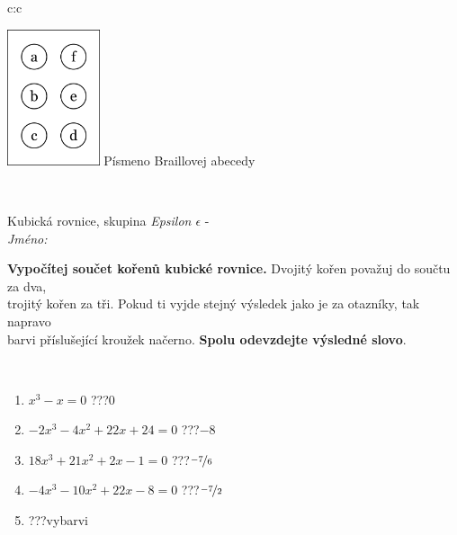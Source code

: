 \documentclass[10pt]{report}
\begin{document}
\begin{tabular}{c:c}
\begin{minipage}[c][104.5mm][t]{0.5\linewidth}
\begin{center}
\begin{minipage}{0.20\linewidth}
\begin{center}
\includegraphics[height=40mm]{../images/braille.png}
{\small Písmeno Braillovej abecedy}
\end{center}
\end{minipage}
\end{center}
\end{minipage}
\\ \hdashline
\begin{minipage}[c][104.5mm][t]{0.5\linewidth}
\begin{center}
\vspace{7mm}
{\huge Kubická rovnice, skupina \textit{Epsilon $\epsilon$} -}\\[5mm]
\textit{Jméno:}\phantom{xxxxxxxxxxxxxxxxxxxxxxxxxxxxxxxxxxxxxxxxxxxxxxxxxxxxxxxxxxxxxxxxx}\\[5mm]
\begin{minipage}{0.95\linewidth}
\begin{center}
\textbf{Vypočítej součet kořenů kubické rovnice.} Dvojitý kořen považuj do součtu za dva,\\trojitý kořen za tři. Pokud ti vyjde stejný výsledek jako je za otazníky, tak napravo\\barvi příslušející kroužek načerno. \textbf{Spolu odevzdejte výsledné slovo}.
\end{center}
\end{minipage}
\\[1mm]
\begin{minipage}{0.79\linewidth}
\begin{center}
\begin{varwidth}{\linewidth}
\begin{enumerate}
\Large
\item $x^3-x=0$\quad \dotfill\; ???\;\dotfill \quad $0$
\item $-2x^3-4x^2+22x+24=0$\quad \dotfill\; ???\;\dotfill \quad $-8$
\item $18x^3+21x^2+2x-1=0$\quad \dotfill\; ???\;\dotfill \quad $\nicefrac{-7}{6}$
\item $-4x^3-10x^2+22x-8=0$\quad \dotfill\; ???\;\dotfill \quad $\nicefrac{-7}{2}$
\item \quad \dotfill\; ???\;\dotfill \quad vybarvi

\end{enumerate}
\end{varwidth}
\end{center}
\end{minipage}
\end{center}
\end{minipage}
\end{tabular}
\end{document}
